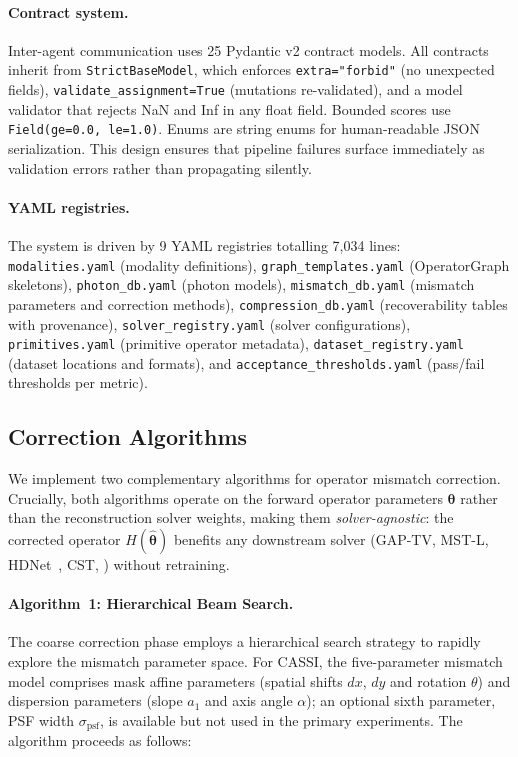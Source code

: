 \paragraph{Contract system.}
Inter-agent communication uses 25 Pydantic v2 contract models.  All
contracts inherit from \texttt{StrictBaseModel}, which enforces
\texttt{extra="forbid"} (no unexpected fields),
\texttt{validate\_assignment=True} (mutations re-validated), and a model
validator that rejects NaN and Inf in any float field.  Bounded scores use
\texttt{Field(ge=0.0, le=1.0)}.  Enums are string enums for human-readable
JSON serialization.  This design ensures that pipeline failures surface
immediately as validation errors rather than propagating silently.

\paragraph{YAML registries.}
The system is driven by 9 YAML registries totalling 7,034 lines:
\texttt{modalities.yaml} (modality definitions),
\texttt{graph\_templates.yaml} (OperatorGraph skeletons),
\texttt{photon\_db.yaml} (photon models),
\texttt{mismatch\_db.yaml} (mismatch parameters and correction methods),
\texttt{compression\_db.yaml} (recoverability tables with provenance),
\texttt{solver\_registry.yaml} (solver configurations),
\texttt{primitives.yaml} (primitive operator metadata),
\texttt{dataset\_registry.yaml} (dataset locations and formats), and
\texttt{acceptance\_thresholds.yaml} (pass/fail thresholds per metric).


\subsection*{Correction Algorithms}
\label{sec:methods:correction}

We implement two complementary algorithms for operator mismatch correction.
Crucially, both algorithms operate on the forward operator parameters
$\boldsymbol{\theta}$ rather than the reconstruction solver weights,
making them \emph{solver-agnostic}: the corrected operator
$H(\hat{\boldsymbol{\theta}})$ benefits any downstream solver (GAP-TV,
MST-L, HDNet~\cite{hu2022hdnet}, CST, \etc{}) without retraining.

\paragraph{Algorithm~1: Hierarchical Beam Search.}
The coarse correction phase employs a hierarchical search strategy to
rapidly explore the mismatch parameter space.  For CASSI, the five-parameter
mismatch model comprises mask affine parameters (spatial shifts $dx$, $dy$
and rotation $\theta$) and dispersion parameters (slope $a_1$ and axis
angle $\alpha$); an optional sixth parameter, PSF width $\sigma_{\text{psf}}$, is available but not used in the primary experiments.
The algorithm proceeds as follows:

